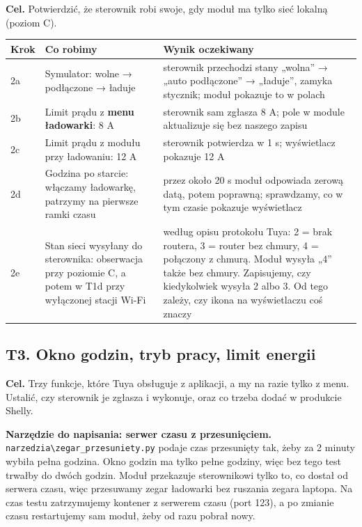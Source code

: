 \documentclass[11pt,a4paper]{article}
\begin{document}
\textbf{Cel.} Potwierdzić, że sterownik robi swoje, gdy moduł ma tylko sieć lokalną (poziom C).


\begin{longtable}{>{\raggedright\arraybackslash}p{3.00cm}>{\raggedright\arraybackslash}p{5.60cm}>{\raggedright\arraybackslash}p{6.68cm}}
\toprule
\rowcolor{apteallight}\textbf{Krok} & \textbf{Co robimy} & \textbf{Wynik oczekiwany} \\
\midrule\endhead
\bottomrule\endfoot
2a & Symulator: wolne {\symbolfont→} podłączone {\symbolfont→} ładuje & sterownik przechodzi stany „wolna” {\symbolfont→} „auto podłączone” {\symbolfont→} „ładuje”, zamyka stycznik; moduł pokazuje to w polach \\
2b & Limit prądu z \textbf{menu ładowarki}: 8 A & sterownik sam zgłasza 8 A; pole w module aktualizuje się bez naszego zapisu \\
2c & Limit prądu z modułu przy ładowaniu: 12 A & sterownik potwierdza w 1 s; wyświetlacz pokazuje 12 A \\
2d & Godzina po starcie: włączamy ładowarkę, patrzymy na pierwsze ramki czasu & przez około 20 s moduł odpowiada zerową datą, potem poprawną; sprawdzamy, co w tym czasie pokazuje wyświetlacz \\
2e & Stan sieci wysyłany do sterownika: obserwacja przy poziomie C, a potem w T1d przy wyłączonej stacji Wi-Fi & według opisu protokołu Tuya: 2 = brak routera, 3 = router bez chmury, 4 = połączony z chmurą. Moduł wysyła „4” także bez chmury. Zapisujemy, czy kiedykolwiek wysyła 2 albo 3. Od tego zależy, czy ikona na wyświetlaczu coś znaczy \\
\end{longtable}

\subsection{T3. Okno godzin, tryb pracy, limit energii}

\textbf{Cel.} Trzy funkcje, które Tuya obsługuje z aplikacji, a my na razie tylko z menu. Ustalić, czy sterownik je zgłasza i wykonuje, oraz co trzeba dodać w produkcie Shelly.


\textbf{Narzędzie do napisania: serwer czasu z przesunięciem.} \texttt{narzedzia\textbackslash{}zegar\_\allowbreak{}przesuniety.\allowbreak{}py} podaje czas przesunięty tak, żeby za 2 minuty wybiła pełna godzina. Okno godzin ma tylko pełne godziny, więc bez tego test trwałby do dwóch godzin. Moduł przekazuje sterownikowi tylko to, co dostał od serwera czasu, więc przesuwamy zegar ładowarki bez ruszania zegara laptopa. Na czas testu zatrzymujemy kontener z serwerem czasu (port 123), a po zmianie czasu restartujemy sam moduł, żeby od razu pobrał nowy.
\end{document}
